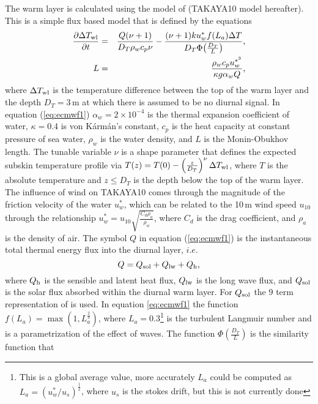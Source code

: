 \documentclass[../tex_main/NEMO_manual]{subfiles}
\begin{document}
The warm layer is calculated using the model of \citet{Takaya_al_JGR10} (TAKAYA10 model
hereafter).  This is a simple flux based model that is defined by the equations
\begin{eqnarray}
\frac{\partial{\Delta T_{\rm{wl}}}}{\partial{t}}&=&\frac{Q(\nu+1)}{D_T\rho_w c_p
\nu}-\frac{(\nu+1)ku^*_{w}f(L_a)\Delta T}{D_T\Phi\!\left(\frac{D_T}{L}\right)} \mbox{,}
\label{eq:ecmwf1} \\
L&=&\frac{\rho_w c_p u^{*^3}_{w}}{\kappa g \alpha_w Q }\mbox{,}\label{eq:ecmwf2}
\end{eqnarray}
where $\Delta T_{\rm{wl}}$ is the temperature difference between the top of the warm
layer and the depth $D_T=3$\,m at which there is assumed to be no diurnal signal. In
equation (\autoref{eq:ecmwf1}) $\alpha_w=2\times10^{-4}$ is the thermal expansion
coefficient of water, $\kappa=0.4$ is von K\'{a}rm\'{a}n's constant, $c_p$ is the heat
capacity at constant pressure of sea water, $\rho_w$ is the
water density, and $L$ is the Monin-Obukhov length. The tunable
variable $\nu$ is a shape parameter that defines the expected
subskin temperature profile via $T(z)=T(0)-\left(\frac{z}{D_T}\right)^\nu\Delta
T_{\rm{wl}}$,
where $T$ is the absolute temperature and $z\le D_T$ is the depth
below the top of the warm layer.
The influence of wind on TAKAYA10 comes through the magnitude of the friction velocity
of the water
$u^*_{w}$, which can be related to the 10\,m wind speed $u_{10}$ through the relationship
$u^*_{w} = u_{10}\sqrt{\frac{C_d\rho_a}{\rho_w}}$, where $C_d$ is
the drag coefficient, and $\rho_a$ is the density of air.  The symbol $Q$ in equation
(\autoref{eq:ecmwf1}) is the instantaneous total thermal energy
flux into
the diurnal layer, $i.e.$
\begin{equation}
Q = Q_{\rm{sol}} + Q_{\rm{lw}} + Q_{\rm{h}}\mbox{,} \label{eq:e_flux_eqn}
\end{equation}
where $Q_{\rm{h}}$ is the sensible and latent heat flux, $Q_{\rm{lw}}$ is the long
wave flux, and $Q_{\rm{sol}}$ is the solar flux absorbed
within the diurnal warm layer. For $Q_{\rm{sol}}$ the 9 term
representation of \citet{Gentemann_al_JGR09} is used.  In equation \autoref{eq:ecmwf1}
the function $f(L_a)=\max(1,L_a^{\frac{2}{3}})$, where $L_a=0.3$\footnote{This
is a global average value, more accurately $L_a$ could be computed as
$L_a=(u^*_{w}/u_s)^{\frac{1}{2}}$, where $u_s$ is the stokes drift, but this is not
currently done} is the turbulent Langmuir number and is a
parametrization of the effect of waves.
The function $\Phi\!\left(\frac{D_T}{L}\right)$ is the similarity function that
\end{document}
